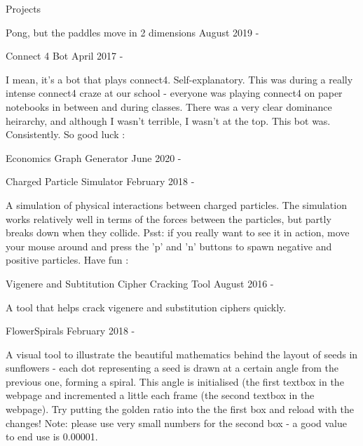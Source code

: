 \documentclass{resume} %
\begin{document}
\begin{rSection}{Projects}
\begin{rSubsection}{ Pong, but the paddles move in 2 dimensions }{ August 2019 -  }{}
\end{rSubsection}



\begin{rSubsection}{ Connect 4 Bot }{ April 2017 -  }{}
\item I mean, it's a bot that plays connect4. Self-explanatory. This was during a really intense connect4 craze at our school - everyone was playing connect4 on paper notebooks in between and during classes. There was a very clear dominance heirarchy, and although I wasn't terrible, I wasn't at the top. This bot was. Consistently. So good luck :

\end{rSubsection}



\begin{rSubsection}{ Economics Graph Generator }{ June 2020 -  }{}
\item 

\end{rSubsection}



\begin{rSubsection}{ Charged Particle Simulator }{ February 2018 -  }{}
\item A simulation of physical interactions between charged particles. The simulation works relatively well in terms of the forces between the particles, but partly breaks down when they collide. Psst: if you really want to see it in action, move your mouse around and press the 'p' and 'n' buttons to spawn negative and positive particles. Have fun :

\end{rSubsection}



\begin{rSubsection}{ Vigenere and Subtitution Cipher Cracking Tool }{ August 2016 -  }{}
\item A tool that helps crack vigenere and substitution ciphers quickly. 

\end{rSubsection}



\begin{rSubsection}{ FlowerSpirals }{ February 2018 -  }{}
\item A visual tool to illustrate the beautiful mathematics behind the layout of seeds in sunflowers - each dot representing a seed is drawn at a certain angle from the previous one, forming a spiral. This angle is initialised (the first textbox in the webpage and incremented a little each frame (the second textbox in the webpage). Try putting the golden ratio into the the first box and reload with the changes! Note: please use very small numbers for the second box - a good value to end use is 0.00001.


\end{rSubsection}
\end{rSection}
\end{document}
